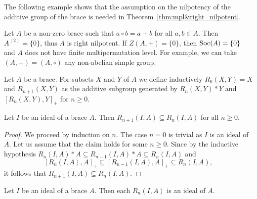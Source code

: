The following example shows that the assumption on the nilpotency of
the additive group of the brace is needed in 
Theorem~\ref{thm:mpl&right_nilpotent}.

\begin{example}
\label{ex:trivial}
Let $A$ be a non-zero brace such that $a\circ b=a+b$ for
all $a,b\in A$. Then $A^{(2)}=\{0\}$, thus $A$ is right nilpotent. 
If $Z(A,+)=\{0\}$, then $\operatorname{Soc}(A)=\{0\}$ and $A$ does not have finite
multipermutation level. For example, we can take $(A,+)=(A,\circ)$
any non-abelian simple group.
\end{example}

Let $A$ be a brace. For subsets $X$ and $Y$ of $A$ we define 
inductively $R_0(X,Y)=X$ and $R_{n+1}(X,Y)$ as the additive subgroup generated by
$R_n(X,Y)*Y$ and $[R_n(X,Y),Y]_+$ for $n\geq0$.

\begin{lemma}
    \label{lem:R:inclusion}
    Let $I$ be an ideal of a brace $A$. Then
    $R_{n+1}(I,A)\subseteq R_n(I,A)$ for all $n\geq0$.
\end{lemma}

\begin{proof}
    We proceed by induction on $n$. The case $n=0$ is trivial as $I$ is an ideal of $A$. 
    Let us assume that the claim holds for some $n\geq0$. Since by the inductive hypothesis
    $R_n(I,A)*A\subseteq R_{n-1}(I,A)*A\subseteq R_{n}(I,A)$ and 
    \[
    [R_n(I,A),A]_+\subseteq [R_{n-1}(I,A),A]_+ \subseteq R_n(I,A),
    \]
    it follows that $R_{n+1}(I,A)\subseteq R_n(I,A)$.
\end{proof}

\begin{proposition}
    \label{lem:R:ideal}
    Let $I$ be an ideal of a brace $A$. 
    Then each $R_{n}(I,A)$ is an ideal of $A$. 
\end{proposition}

